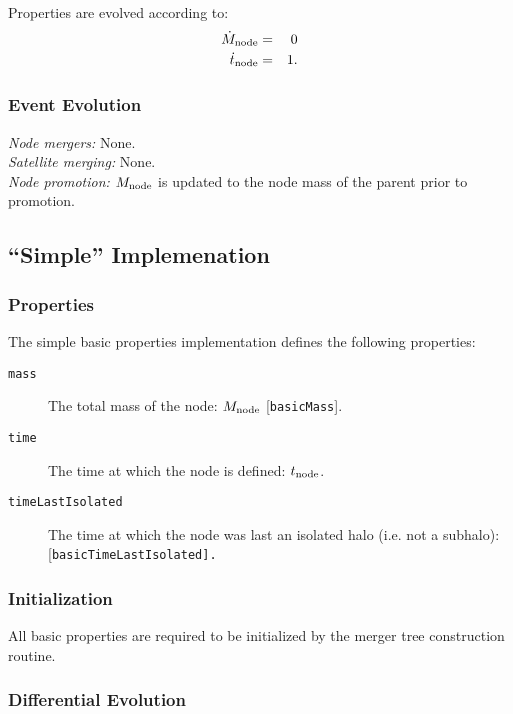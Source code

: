 Properties are evolved according to:
\begin{eqnarray}
 \dot{M}_{\rm node} &=& 0 \\
 \dot{t}_{\rm node} &=& 1.
\end{eqnarray}

\subsubsection{Event Evolution}

\noindent\emph{Node mergers:} None.\\

\noindent\emph{Satellite merging:} None.\\

\noindent\emph{Node promotion:} $M_{\rm node}$ is updated to the \gls{node} mass of the parent prior to promotion.\\

\subsection{``Simple'' Implemenation}

\subsubsection{Properties}

The simple basic properties implementation defines the following properties:
\begin{description}
 \item [{\tt mass}] The total mass of the node: $M_{\rm node}$ [{\tt basicMass}].
 \item [{\tt time}] The time at which the \gls{node} is defined: $t_{\rm node}$.
 \item [{\tt timeLastIsolated}] The time at which the \gls{node} was last an isolated halo (i.e. not a subhalo): [\tt basicTimeLastIsolated].
\end{description}

\subsubsection{Initialization}

All basic properties are required to be initialized by the merger tree construction routine.

\subsubsection{Differential Evolution}

